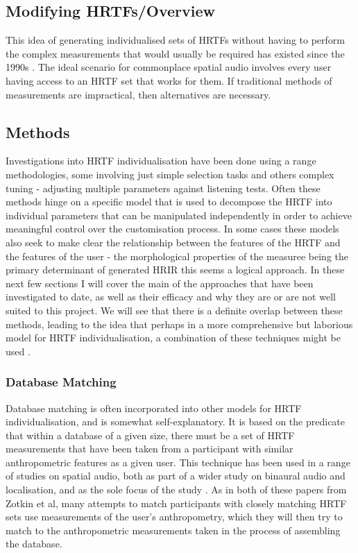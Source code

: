 \subsection{Modifying HRTFs/Overview}
This idea of generating individualised sets of HRTFs without having to perform the complex measurements that would usually be required has existed since the 1990s \citep{Kulkarni1995}. The ideal scenario for commonplace spatial audio involves every user having access to an HRTF set that works for them. If traditional methods of measurements are impractical, then alternatives are necessary.

\subsection{Methods}
Investigations into HRTF individualisation have been done using a range methodologies, some involving just simple selection tasks and others complex tuning - adjusting multiple parameters against listening tests. Often these methods hinge on a specific model that is used to decompose the HRTF into individual parameters that can be manipulated independently in order to achieve meaningful control over the customisation process. In some cases these models also seek to make clear the relationship between the features of the HRTF and the features of the user - the morphological properties of the measuree being the primary determinant of generated HRIR this seems a logical approach. In these next few sections I will cover the main of the approaches that have been investigated to date, as well as their efficacy and why they are or are not well suited to this project. We will see that there is a definite overlap between these methods, leading to the idea that perhaps in a more comprehensive but laborious model for HRTF individualisation, a combination of these techniques might be used \citep{Hoene2017}.

\subsubsection{Database Matching}
Database matching is often incorporated into other models for HRTF individualisation, and is somewhat self-explanatory. It is based on the predicate that within a database of a given size, there must be a set of HRTF measurements that have been taken from a participant with similar anthropometric features as a given user. This technique has been used in a range of studies on spatial audio, both as part of a wider study on binaural audio and localisation, \citep{Zotkin2002} and as the sole focus of the study \citep{Zotkin}. As in both of these papers from Zotkin et al, many attempts to match participants with closely matching HRTF sets use measurements of the user's anthropometry, which they will then try to match to the anthropometric measurements taken in the process of assembling the database. 

